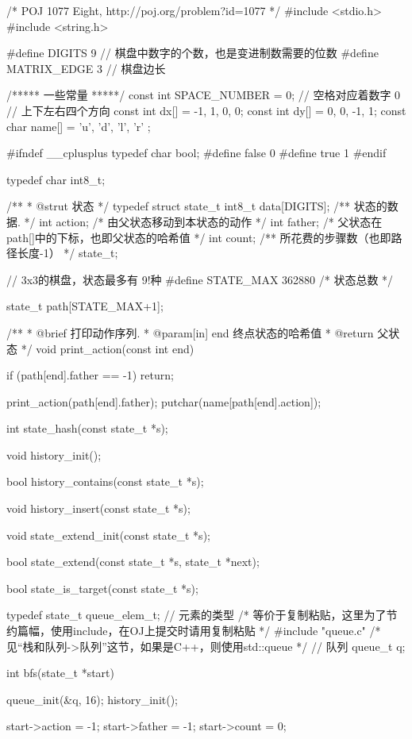 \begin{Codex}[label=eight_digits_bfs.c]
/* POJ 1077 Eight, http://poj.org/problem?id=1077 */
#include <stdio.h>
#include <string.h>

#define DIGITS 9 // 棋盘中数字的个数，也是变进制数需要的位数
#define     MATRIX_EDGE 3       // 棋盘边长

/***** 一些常量 *****/
const int SPACE_NUMBER = 0; // 空格对应着数字 0
// 上下左右四个方向
const int dx[] = {-1, 1, 0, 0};
const int dy[] = {0, 0, -1, 1};
const char name[] = { 'u', 'd', 'l', 'r' };

#ifndef __cplusplus
typedef char bool;
#define false 0
#define true 1
#endif

typedef char int8_t;

/**
 * @strut 状态
 */
typedef struct state_t {
    int8_t data[DIGITS];  /** 状态的数据. */
    int action; /* 由父状态移动到本状态的动作 */
    int father; /* 父状态在path[]中的下标，也即父状态的哈希值 */
    int count;  /** 所花费的步骤数（也即路径长度-1） */
} state_t;

// 3x3的棋盘，状态最多有 9!种
#define STATE_MAX 362880  /* 状态总数 */

state_t path[STATE_MAX+1];

/**
 * @brief 打印动作序列.
 * @param[in] end 终点状态的哈希值
 * @return 父状态
 */
void print_action(const int end) {
    if (path[end].father == -1) return;

    print_action(path[end].father);
    putchar(name[path[end].action]);
}

int state_hash(const state_t *s);

void history_init();

bool history_contains(const state_t *s);

void history_insert(const state_t *s);

void state_extend_init(const state_t *s);

bool state_extend(const state_t *s, state_t *next);

bool state_is_target(const state_t *s);

typedef state_t queue_elem_t; // 元素的类型
/* 等价于复制粘贴，这里为了节约篇幅，使用include，在OJ上提交时请用复制粘贴 */
#include "queue.c"  /* 见“栈和队列->队列”这节，如果是C++，则使用std::queue */
// 队列
queue_t q;

int bfs(state_t *start) {
    queue_init(&q, 16);
    history_init();

    start->action = -1;
    start->father = -1;
    start->count = 0;

}
\end{Codex}
